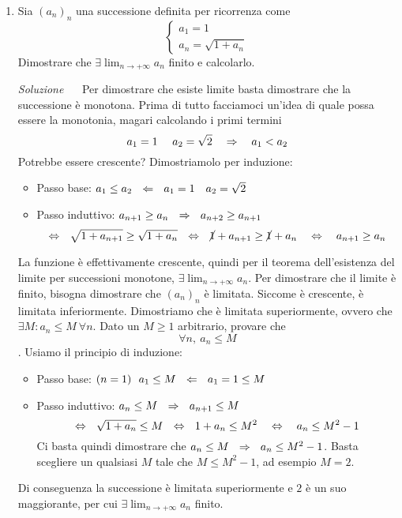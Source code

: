 \documentclass{article}
\begin{document}
\begin{enumerate}[label=\textbf{Esercizio 6.\arabic*.},itemindent=*]
\begin{enumerate}
    \end{enumerate}
    \item Sia $(a_n)_n$ una successione definita per ricorrenza come 
    \[\begin{cases}
        a_1=1\\
        a_n=\sqrt{1+a_n}
    \end{cases}\]
    Dimostrare che $\exists \lim_{n\to+ \infty}a_n$ finito e calcolarlo.
    \item[\textit{\large Soluzione~}]~
    Per dimostrare che esiste limite basta dimostrare che la successione è monotona.
    Prima di tutto facciamoci un'idea di quale possa essere la monotonia, magari calcolando i primi termini
    \[a_1=1~~~~a_2=\sqrt{2}~~~\Rightarrow~~~a_1<a_2\]
    Potrebbe essere crescente? Dimostriamolo per induzione:
    \begin{itemize} 
        \item Passo base: $a_1\leq a_2~~\Leftarrow~~a_1=1~~~a_2=\sqrt{2}$
        \item Passo induttivo:  $a_{n+1}\geq a_n ~~\Rightarrow~~ a_{n+2}\geq a_{n+1}$
        \[\Leftrightarrow ~~ \sqrt{1+a_{n+1}}\geq \sqrt{1+a_n}~~\Leftrightarrow~~\cancel{1}+a_{n+1}\geq\cancel{1}+a_n~~~\Leftrightarrow~~~a_{n+1}\geq a_n\]
    \end{itemize}
    La funzione è effettivamente crescente, quindi per il teorema dell'esistenza del limite per successioni monotone, $\exists \lim_{n\to+\infty}a_n$. Per dimostrare che il limite è finito, bisogna dimostrare che $(a_n)_n$ è limitata. Siccome è crescente, è limitata inferiormente. Dimostriamo che è limitata superiormente, ovvero che $\exists M:a_n\leq M~\forall n$. Dato un $M\geq 1$ arbitrario, provare che \[\forall n, ~a_n\leq M\]. Usiamo il principio di induzione:
    \begin{itemize} 
        \item Passo base: $(n=1) ~~a_1\leq M~~\Leftarrow~~a_1=1\leq M$
        \item Passo induttivo:  $a_n\leq M ~~\Rightarrow~~ a_{n+1}\leq M$
        \[\Leftrightarrow ~~ \sqrt{1+a_{n}}\leq M~~\Leftrightarrow~~1+a_{n}\leq M
        ^2~~~\Leftrightarrow~~~a_{n}\leq M
        ^2-1\]
        Ci basta quindi dimostrare che $a_n\leq M ~~\Rightarrow~~ a_{n}\leq M^2-1$. Basta scegliere un qualsiasi $M$ tale che $M\leq M^2-1$, ad esempio $M=2$. 
    \end{itemize}
    Di conseguenza la successione è limitata superiormente e $2$ è un suo maggiorante, per cui $\exists \lim_{n\to+ \infty}a_n$ finito.
    \begin{oss}

\end{oss}
\end{enumerate}
\end{document}
